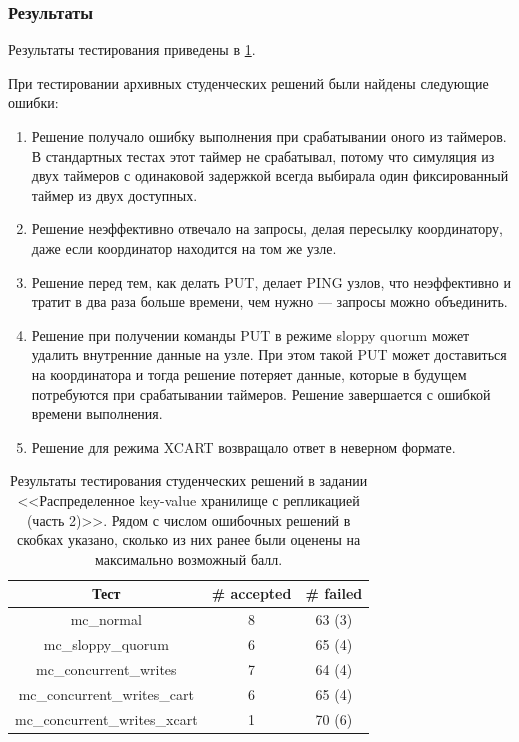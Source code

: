 \documentclass[a4paper,12pt]{extarticle}
\begin{document}
\subsubsection{Результаты}

Результаты тестирования приведены в \cref{tab10}.

При тестировании архивных студенческих решений были найдены следующие ошибки:
\begin{enumerate}
    \item Решение получало ошибку выполнения при срабатывании оного из таймеров.
В стандартных тестах этот таймер не срабатывал, потому что симуляция из двух таймеров с одинаковой задержкой всегда выбирала один фиксированный таймер из двух доступных.
    \item Решение неэффективно отвечало на запросы, делая пересылку координатору, даже если координатор находится на том же узле.
    \item Решение перед тем, как делать PUT, делает PING узлов, что неэффективно и тратит в два раза больше времени, чем нужно --- запросы можно объединить.
    \item Решение при получении команды PUT в режиме sloppy quorum может удалить внутренние данные на узле.
При этом такой PUT может доставиться на координатора и тогда решение потеряет данные, которые в будущем потребуются при срабатывании таймеров.
Решение завершается с ошибкой времени выполнения.
    \item Решение для режима XCART возвращало ответ в неверном формате.
\end{enumerate}

\begin{table}[htbp]
    \caption{Результаты тестирования студенческих решений в задании <<Распределенное key-value хранилище с репликацией (часть 2)>>. Рядом с числом ошибочных решений в скобках указано, сколько из них ранее были оценены на максимально возможный балл. }
    \begin{center}
    \begin{tabular}{|c|c|c|}
    \hline
    \textbf{Тест} & \textbf{\# accepted} & \textbf{\# failed}  \\
    \hline
    mc\_normal  & 8 & 63 (3) \\
    \hline
    mc\_sloppy\_quorum  & 6 & 65 (4) \\
    \hline
    mc\_concurrent\_writes & 7 & 64  (4) \\
    \hline
    mc\_concurrent\_writes\_cart & 6 & 65 (4) \\
    \hline
    mc\_concurrent\_writes\_xcart & 1 & 70 (6) \\
    \hline
    \end{tabular}
    \label{tab10}
    \end{center}
\end{table}
\end{document}
